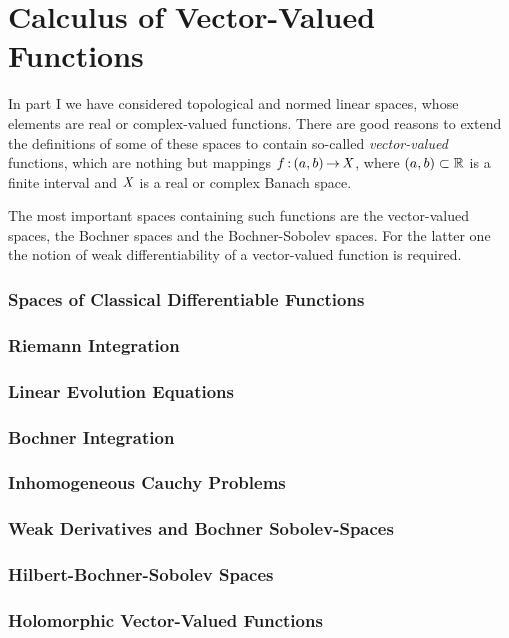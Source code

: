 \documentclass[11pt,twoside]{article}
\begin{document}
\part{Calculus of Vector-Valued Functions}                                     %
In part I we have considered topological and normed linear spaces,
whose elements are real or complex-valued functions.
There are good reasons to extend the definitions of some of these spaces
to contain so-called \textit{vector-valued} functions,
which are nothing but mappings $f{\,:\,}(a,b) {\,\to\,} \mathit{X}$,
where $(a,b) \subset {\mathbb{R}}$ is a finite interval
and $\mathit{X}$ is a real or complex Banach space.

\subparagraph{}
The most important spaces containing such functions are
the vector-valued {\HOELDER} spaces,
the Bochner spaces and
the Bochner-Sobolev spaces.
For the latter one the notion of weak differentiability of a vector-valued
function is required.

\section{Spaces of Classical Differentiable Functions}
\section{Riemann Integration}
\section{Linear Evolution Equations}
\section{Bochner Integration}
\section{Inhomogeneous Cauchy Problems}
\section{Weak Derivatives and Bochner Sobolev-Spaces}
\section{Hilbert-Bochner-Sobolev Spaces}
\section{Holomorphic Vector-Valued Functions}
\end{document}
